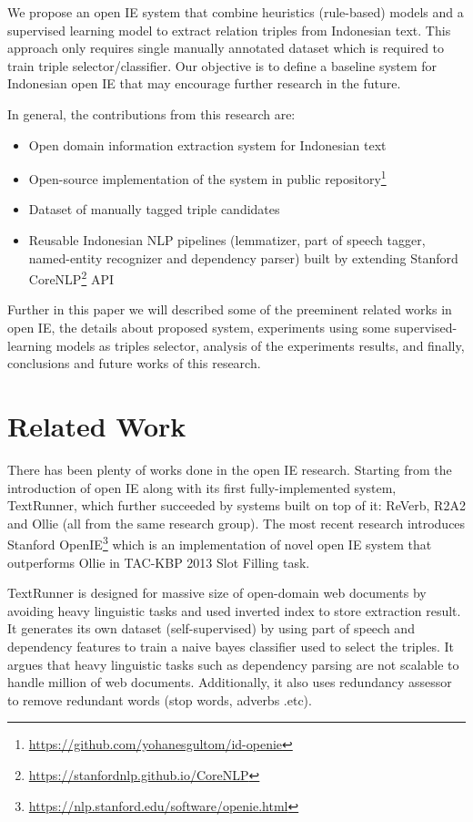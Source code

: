 \documentclass[conference,compsoc]{IEEEtran}
\begin{document}
We propose an open IE system that combine heuristics (rule-based) models and a supervised learning model to extract relation triples from Indonesian text. This approach only requires single manually annotated dataset which is required to train triple selector/classifier. Our objective is to define a baseline system for Indonesian open IE that may encourage further research in the future.

In general, the contributions from this research are:

\begin{itemize}
\item Open domain information extraction system for Indonesian text
\item Open-source implementation of the system in public repository\footnote{\url{https://github.com/yohanesgultom/id-openie}}
\item Dataset of manually tagged triple candidates
\item Reusable Indonesian NLP pipelines (lemmatizer, part of speech tagger, named-entity recognizer and dependency parser) built by extending Stanford CoreNLP\footnote{\url{https://stanfordnlp.github.io/CoreNLP}} API
\end{itemize}

Further in this paper we will described some of the preeminent related works in open IE, the details about proposed system, experiments using some supervised-learning models as triples selector, analysis of the experiments results, and finally, conclusions and future works of this research.

\section{Related Work}

There has been plenty of works done in the open IE research. Starting from the introduction of open IE along with its first fully-implemented system, TextRunner, which further succeeded by systems built on top of it: ReVerb, R2A2 and Ollie (all from the same research group). The most recent research introduces Stanford OpenIE\footnote{\url{https://nlp.stanford.edu/software/openie.html}} which is an implementation of novel open IE system that outperforms Ollie in TAC-KBP
2013 Slot Filling task\cite{angeli2015leveraging}.

TextRunner is designed for massive size of open-domain web documents by avoiding heavy linguistic tasks and used inverted index to store extraction result\cite{banko2007open}. It generates its own dataset (self-supervised) by using part of speech and dependency features to train a naive bayes classifier used to select the triples. It argues that heavy linguistic tasks such as dependency parsing are not scalable to handle million of web documents. Additionally, it also uses redundancy assessor to remove redundant words (stop words, adverbs .etc).
\end{document}
